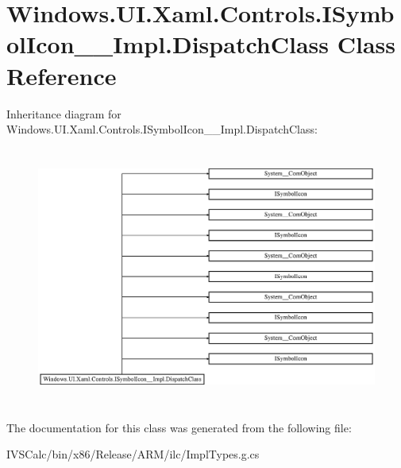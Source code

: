 \hypertarget{class_windows_1_1_u_i_1_1_xaml_1_1_controls_1_1_i_symbol_icon_____impl_1_1_dispatch_class}{}\section{Windows.\+U\+I.\+Xaml.\+Controls.\+I\+Symbol\+Icon\+\_\+\+\_\+\+Impl.\+Dispatch\+Class Class Reference}
\label{class_windows_1_1_u_i_1_1_xaml_1_1_controls_1_1_i_symbol_icon_____impl_1_1_dispatch_class}
Inheritance diagram for Windows.\+U\+I.\+Xaml.\+Controls.\+I\+Symbol\+Icon\+\_\+\+\_\+\+Impl.\+Dispatch\+Class\+:\begin{figure}[H]
\begin{center}
\leavevmode
\includegraphics[height=8.555555cm]{class_windows_1_1_u_i_1_1_xaml_1_1_controls_1_1_i_symbol_icon_____impl_1_1_dispatch_class}
\end{center}
\end{figure}


The documentation for this class was generated from the following file\+:\begin{DoxyCompactItemize}
\item 
I\+V\+S\+Calc/bin/x86/\+Release/\+A\+R\+M/ilc/Impl\+Types.\+g.\+cs\end{DoxyCompactItemize}
